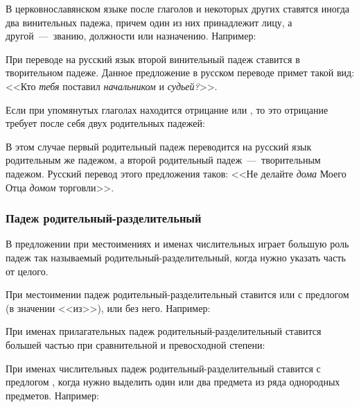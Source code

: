 \documentclass[11pt,a4paper,oneside]{memoir}
\begin{document}
    В церковнославянском языке после глаголов {} и некоторых других ставятся иногда два винительных падежа, причем один из них принадлежит лицу, а другой~---~званию, должности или назначению. Например:

    \bigskip{}
    
    При переводе на русский язык второй винительный падеж ставится в творительном падеже. Данное предложение в русском переводе примет такой вид: <<Кто \emph{тебя} поставил \emph{начальником} и \emph{судьей?}>>.
    
    Если при упомянутых глаголах находится отрицание {\slv{}} или {\slv{}}, то это отрицание требует после себя двух родительных падежей:
    
    \bigskip{}
    
    В этом случае первый родительный падеж переводится на русский язык родительным же падежом, а второй родительный падеж~---~творительным падежом. Русский перевод этого предложения таков: <<Не делайте \emph{дома} Моего Отца \emph{домом} торговли>>.
    
                \subsubsection{Падеж родительный-разделительный}

    В предложении при местоимениях и именах числительных играет большую роль падеж так называемый родительный-разделительный, когда нужно указать часть от целого.
    
    При местоимении падеж родительный-разделительный ставится или с предлогом {} (в значении <<из>>), или без него. Например:

    \bigskip{}
    
    При именах прилагательных падеж родительный-разделительный ставится большей частью при сравнительной и превосходной степени:
    
    \bigskip{}

    При именах числительных падеж родительный-разделительный ставится с предлогом {}, когда нужно выделить один или два предмета из ряда однородных предметов. Например:
    
\end{document}
